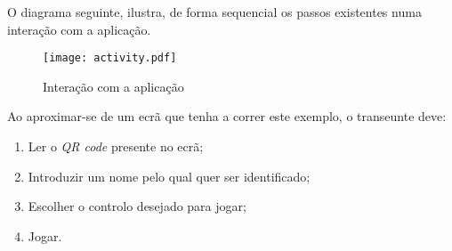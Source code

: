 	O diagrama seguinte, ilustra, de forma sequencial os passos existentes numa interação com a aplicação.
	\newline

	\begin{figure}[ht]
	\centering
	\texttt{[image: activity.pdf]}
	\caption[Utilização]{Interação com a aplicação}
	\label{fig:interagir}
	\end{figure}

\pagebreak

	Ao aproximar-se de um ecrã que tenha a correr este exemplo, o transeunte deve:

	\begin{enumerate}
		\item Ler o \textit{QR code} presente no ecrã;
		\item Introduzir um nome pelo qual quer ser identificado;
		\item Escolher o controlo desejado para jogar;
		\item Jogar.
	\end{enumerate}


	


	





